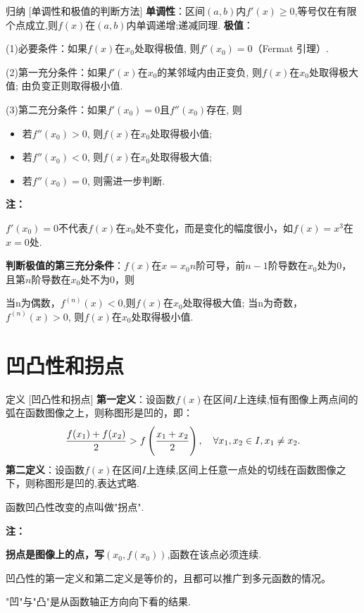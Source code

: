 \documentclass[a4paper,12pt,oneside,fontset=none]{ctexbook}
\renewcommand{\geq}{\geqslant}
\let\olddfrac\dfrac
\renewcommand{\dfrac}[2]{
    \olddfrac{#1\vrule width 0pt height 1.15em depth 0em}{#2\vrule width 0pt height 0em depth 0.6em}
}
\newenvironment{induction}[1][]{\begin{thmBox}{归纳}{#1}}{\end{thmBox}}
\newcounter{definition}[chapter]
\newenvironment{definition}[1][]{\begin{defBox}{定义}{#1}}{\end{defBox}}
\newenvironment{note}{
    \par\vspace{0.5em}\noindent
    \textbf{\color{NoteColor} 注：}
}{
    \par\vspace{0.5em}
}
\numberwithin{equation}{chapter}
\begin{document}
\begin{induction}
    [单调性和极值的判断方法]
    \textbf{单调性}：区间$(a,b)$内$f'(x)\geq0$,等号仅在有限个点成立,则$f(x)$在$(a,b)$内单调递增;递减同理.
    \textbf{极值}：
    
    (1)必要条件：如果$f(x)$在$x_0$处取得极值, 则$f'(x_0) = 0$（Fermat 引理）.

    (2)第一充分条件：如果$f'(x)$在$x_0$的某邻域内由正变负, 则$f(x)$在$x_0$处取得极大值; 由负变正则取得极小值.

    (3)第二充分条件：如果$f'(x_0) = 0$且$f''(x_0)$存在, 则
    \begin{itemize}
        \item 若$f''(x_0) > 0$, 则$f(x)$在$x_0$处取得极小值;
        \item 若$f''(x_0) < 0$, 则$f(x)$在$x_0$处取得极大值;
        \item 若$f''(x_0) = 0$, 则需进一步判断.
    \end{itemize}
\end{induction}
\begin{note}
    $f'(x_0)=0$不代表$f(x)$在$x_0$处不变化，而是变化的幅度很小，如$f(x)=x^3$在$x=0$处.
    
    \textbf{判断极值的第三充分条件}：$f(x)$在$x=x_0 n$阶可导，前$n-1$阶导数在$x_0$处为0，且第$n$阶导数在$x_0$处不为0，则

    当n为偶数，$f^{(n)}(x)<0$,则$f(x)$在$x_0$处取得极大值; 当n为奇数，$f^{(n)}(x)>0$, 则$f(x)$在$x_0$处取得极小值.
\end{note}


\section{凹凸性和拐点}

\begin{definition}
    [凹凸性和拐点]
    \textbf{第一定义}：设函数$f(x)$在区间$I$上连续,恒有图像上两点间的弧在函数图像之上，则称图形是凹的，即：
    \[
    \dfrac{f(x_1) + f(x_2)}{2} > f\left(\dfrac{x_1 + x_2}{2}\right), \quad \forall x_1, x_2 \in I, x_1 \ne x_2.
    \]
    \textbf{第二定义}：设函数$f(x)$在区间$I$上连续,区间上任意一点处的切线在函数图像之下，则称图形是凹的,表达式略.    
    
    函数凹凸性改变的点叫做"拐点".
\end{definition}
\begin{note}
    \textbf{拐点是图像上的点，写$(x_0,f(x_0))$},函数在该点必须连续.
   
    凹凸性的第一定义和第二定义是等价的，且都可以推广到多元函数的情况。

    "凹"与"凸"是从函数轴正方向向下看的结果.
\end{note}
\end{document}
